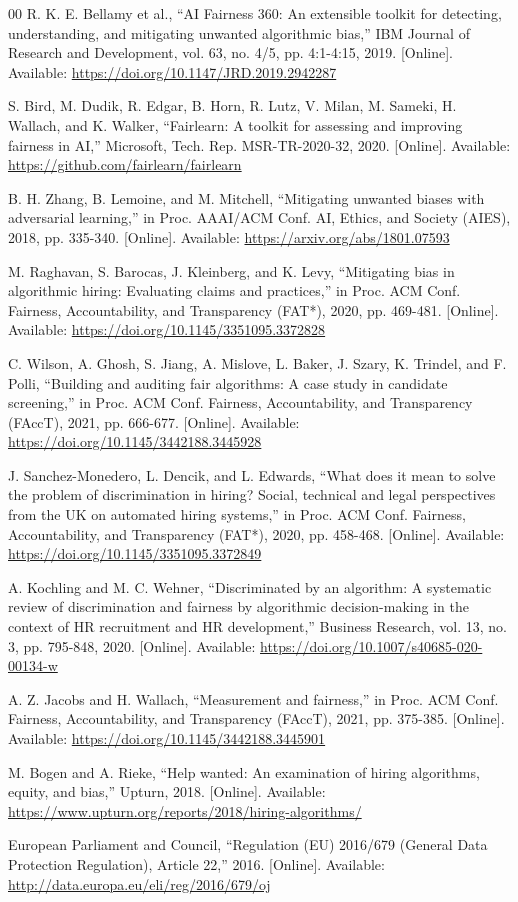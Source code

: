\documentclass[conference]{IEEEtran}
\begin{document}
\begin{thebibliography}{00}
 R. K. E. Bellamy et al., ``AI Fairness 360: An extensible toolkit for detecting, understanding, and mitigating unwanted algorithmic bias,'' IBM Journal of Research and Development, vol. 63, no. 4/5, pp. 4:1-4:15, 2019. [Online]. Available: \url{https://doi.org/10.1147/JRD.2019.2942287}

 S. Bird, M. Dudik, R. Edgar, B. Horn, R. Lutz, V. Milan, M. Sameki, H. Wallach, and K. Walker, ``Fairlearn: A toolkit for assessing and improving fairness in AI,'' Microsoft, Tech. Rep. MSR-TR-2020-32, 2020. [Online]. Available: \url{https://github.com/fairlearn/fairlearn}

 B. H. Zhang, B. Lemoine, and M. Mitchell, ``Mitigating unwanted biases with adversarial learning,'' in Proc. AAAI/ACM Conf. AI, Ethics, and Society (AIES), 2018, pp. 335-340. [Online]. Available: \url{https://arxiv.org/abs/1801.07593}

 M. Raghavan, S. Barocas, J. Kleinberg, and K. Levy, ``Mitigating bias in algorithmic hiring: Evaluating claims and practices,'' in Proc. ACM Conf. Fairness, Accountability, and Transparency (FAT*), 2020, pp. 469-481. [Online]. Available: \url{https://doi.org/10.1145/3351095.3372828}

 C. Wilson, A. Ghosh, S. Jiang, A. Mislove, L. Baker, J. Szary, K. Trindel, and F. Polli, ``Building and auditing fair algorithms: A case study in candidate screening,'' in Proc. ACM Conf. Fairness, Accountability, and Transparency (FAccT), 2021, pp. 666-677. [Online]. Available: \url{https://doi.org/10.1145/3442188.3445928}

 J. Sanchez-Monedero, L. Dencik, and L. Edwards, ``What does it mean to solve the problem of discrimination in hiring? Social, technical and legal perspectives from the UK on automated hiring systems,'' in Proc. ACM Conf. Fairness, Accountability, and Transparency (FAT*), 2020, pp. 458-468. [Online]. Available: \url{https://doi.org/10.1145/3351095.3372849}

 A. Kochling and M. C. Wehner, ``Discriminated by an algorithm: A systematic review of discrimination and fairness by algorithmic decision-making in the context of HR recruitment and HR development,'' Business Research, vol. 13, no. 3, pp. 795-848, 2020. [Online]. Available: \url{https://doi.org/10.1007/s40685-020-00134-w}

 A. Z. Jacobs and H. Wallach, ``Measurement and fairness,'' in Proc. ACM Conf. Fairness, Accountability, and Transparency (FAccT), 2021, pp. 375-385. [Online]. Available: \url{https://doi.org/10.1145/3442188.3445901}

 M. Bogen and A. Rieke, ``Help wanted: An examination of hiring algorithms, equity, and bias,'' Upturn, 2018. [Online]. Available: \url{https://www.upturn.org/reports/2018/hiring-algorithms/}

 European Parliament and Council, ``Regulation (EU) 2016/679 (General Data Protection Regulation), Article 22,'' 2016. [Online]. Available: \url{http://data.europa.eu/eli/reg/2016/679/oj}

\end{thebibliography}
\end{document}
